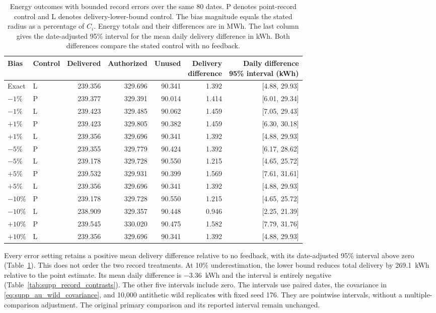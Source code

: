 \documentclass[11pt]{article}
\begin{document}
\begin{table}[!ht]
\centering
\caption{Energy outcomes with bounded record errors over the same 80 dates.
P denotes point-record control and L denotes delivery-lower-bound control.
The bias magnitude equals the stated radius as a percentage of $C_i$.
Energy totals and their differences are in MWh. The last column gives the
date-adjusted 95\% interval for the mean daily delivery difference in kWh.
Both differences compare the stated control with no feedback.}
\label{tab:supp_record_energy}
\vspace{3pt}
\footnotesize
\setlength{\tabcolsep}{4pt}
\begin{tabular}{@{}llrrrrr@{}}
\toprule
Bias & Control & Delivered & Authorized & Unused &
\shortstack{Delivery\\difference} & \shortstack{Daily difference\\95\% interval (kWh)} \\
\midrule
Exact & L & 239.356 & 329.696 & 90.341 & 1.392 & [4.88, 29.93] \\
$-1\%$ & P & 239.377 & 329.391 & 90.014 & 1.414 & [6.01, 29.34] \\
$-1\%$ & L & 239.423 & 329.485 & 90.062 & 1.459 & [7.05, 29.43] \\
$+1\%$ & P & 239.423 & 329.805 & 90.382 & 1.459 & [6.30, 30.18] \\
$+1\%$ & L & 239.356 & 329.696 & 90.341 & 1.392 & [4.88, 29.93] \\
$-5\%$ & P & 239.355 & 329.779 & 90.424 & 1.392 & [6.17, 28.62] \\
$-5\%$ & L & 239.178 & 329.728 & 90.550 & 1.215 & [4.65, 25.72] \\
$+5\%$ & P & 239.532 & 329.931 & 90.399 & 1.569 & [7.61, 31.61] \\
$+5\%$ & L & 239.356 & 329.696 & 90.341 & 1.392 & [4.88, 29.93] \\
$-10\%$ & P & 239.178 & 329.728 & 90.550 & 1.215 & [4.65, 25.72] \\
$-10\%$ & L & 238.909 & 329.357 & 90.448 & 0.946 & [2.25, 21.39] \\
$+10\%$ & P & 239.545 & 330.020 & 90.475 & 1.582 & [7.79, 31.76] \\
$+10\%$ & L & 239.356 & 329.696 & 90.341 & 1.392 & [4.88, 29.93] \\
\bottomrule
\end{tabular}
\end{table}

Every error setting retains a positive mean delivery difference relative to
no feedback, with its date-adjusted 95\% interval above zero
(Table~\ref{tab:supp_record_energy}). This does not order the two record
treatments. At 10\% underestimation, the lower bound reduces total delivery
by 269.1~kWh relative to the point estimate. Its mean daily difference is
$-3.36$~kWh and the interval is entirely negative
(Table~\ref{tab:supp_record_contrasts}). The other five intervals include zero.
The intervals use paired dates, the covariance in
\eqref{eq:supp_au_wild_covariance}, and
10,000 antithetic wild replicates with fixed seed 176. They are pointwise
intervals, without a multiple-comparison adjustment. The original primary
comparison and its reported interval remain unchanged.
\end{document}
